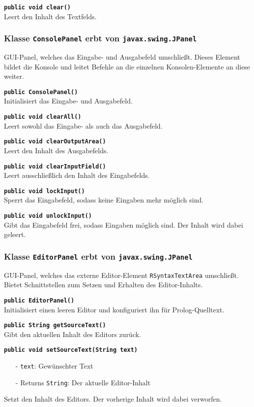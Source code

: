 \documentclass[parskip=full,11pt,twoside]{scrartcl}
\begin{document}
\textbf{\texttt{public void clear()}}\\
Leert den Inhalt des Textfelds.

\subsubsection{Klasse \texttt{ConsolePanel} erbt von \texttt{javax.swing.JPanel}}

GUI-Panel, welches das Eingabe- und Ausgabefeld umschließt. Dieses Element bildet die Konsole und leitet Befehle an die einzelnen Konsolen-Elemente an diese weiter.

\textbf{\texttt{public ConsolePanel()}}\\
Initialisiert das Eingabe- und Ausgabefeld.

\textbf{\texttt{public void clearAll()}}\\
Leert sowohl das Eingabe- als auch das Ausgabefeld.

\textbf{\texttt{public void clearOutputArea()}}\\
Leert den Inhalt des Ausgabefelds.

\textbf{\texttt{public void clearInputField()}}\\
Leert ausschließlich den Inhalt des Eingabefelds.

\textbf{\texttt{public void lockInput()}}\\
Sperrt das Eingabefeld, sodass keine Eingaben mehr möglich sind.

\textbf{\texttt{public void unlockInput()}}\\
Gibt das Eingabefeld frei, sodass Eingaben möglich sind. Der Inhalt wird dabei geleert.

\subsubsection{Klasse \texttt{EditorPanel} erbt von \texttt{javax.swing.JPanel}}

GUI-Panel, welches das externe Editor-Element \texttt{RSyntaxTextArea} umschließt. Bietet Schnittstellen zum Setzen und Erhalten des Editor-Inhalts.

\textbf{\texttt{public EditorPanel()}}\\
Initialisiert einen leeren Editor und konfiguriert ihn für Prolog-Quelltext.

\textbf{\texttt{public String getSourceText()}}\\
Gibt den aktuellen Inhalt des Editors zurück.

\textbf{\texttt{public void setSourceText(String text)}}
\begin{itemize}[noitemsep]
	\item[-] \texttt{text}: Gewünschter Text
	\item[-] Returns \texttt{String}: Der aktuelle Editor-Inhalt
\end{itemize}
Setzt den Inhalt des Editors. Der vorherige Inhalt wird dabei verworfen.
\end{document}
